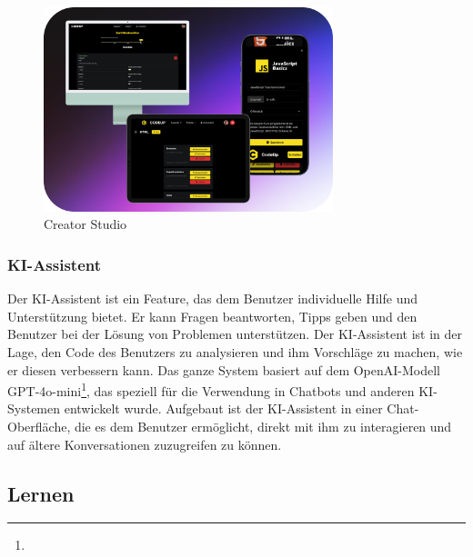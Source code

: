 \documentclass[main.tex]{subfiles}
\begin{document}
    \begin{figure}[h]
        \centering
        \includegraphics[width=0.75\textwidth]{assets/creator-studio}
        \caption{Creator Studio}
        \label{fig:creator-studio}
    \end{figure}
    \subsubsection{KI-Assistent}
    Der KI-Assistent ist ein Feature, das dem Benutzer individuelle Hilfe und Unterstützung bietet.
    Er kann Fragen beantworten, Tipps geben und den Benutzer bei der Lösung von Problemen unterstützen.
    Der KI-Assistent ist in der Lage, den Code des Benutzers zu analysieren und ihm Vorschläge zu machen, wie er diesen verbessern kann.
    Das ganze System basiert auf dem OpenAI-Modell GPT-4o-mini\footnote{}, das speziell für die Verwendung in Chatbots und anderen KI-Systemen entwickelt wurde.
    Aufgebaut ist der KI-Assistent in einer Chat-Oberfläche, die es dem Benutzer ermöglicht, direkt mit ihm zu interagieren und auf ältere Konversationen zuzugreifen zu können.
    \subsection{Lernen}
\end{document}
